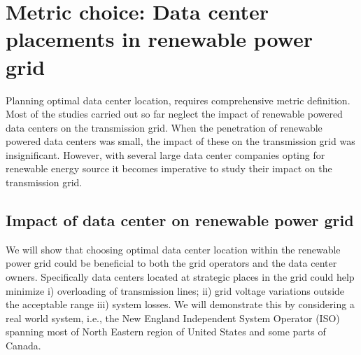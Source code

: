 \section{Metric choice: Data center placements in renewable power grid}
\label{sec:quantify}
Planning optimal data center location, requires comprehensive metric definition. Most of the studies carried out so far neglect the impact of renewable powered data centers on the transmission grid. When the penetration of renewable powered data centers was small, the impact of these on the transmission grid was insignificant. However, with several large data center companies opting for renewable energy source it becomes imperative to study their impact on the transmission grid.

\subsection{Impact of data center on renewable power grid}
\label{sec:metrics}
We will show that choosing optimal data center location within the renewable power grid could be beneficial to both the grid operators and the data center owners. Specifically data centers located at strategic places in the grid could help minimize i) overloading of transmission lines; ii) grid voltage variations outside the acceptable range iii) system losses. We will demonstrate this by considering a real world system, i.e., the New England Independent System Operator (ISO) spanning most of North Eastern region of United States and some parts of Canada.
